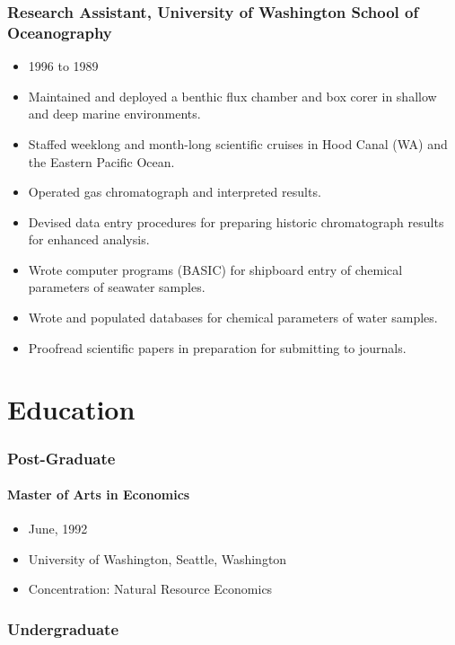 \documentclass[12pt]{article}
\begin{document}
\subsubsection{Research Assistant, University of Washington School of Oceanography}

\begin{itemize}
\item 1996 to 1989
\item
  Maintained and deployed a benthic flux chamber and box corer in
  shallow and deep marine environments.
\item
  Staffed weeklong and month-long scientific cruises in Hood Canal (WA)
  and the Eastern Pacific Ocean.
\item
  Operated gas chromatograph and interpreted results.
\item
  Devised data entry procedures for preparing historic chromatograph
  results for enhanced analysis.
\item
  Wrote computer programs (BASIC) for shipboard entry of chemical
  parameters of seawater samples.
\item
  Wrote and populated databases for chemical parameters of water
  samples.
\item
  Proofread scientific papers in preparation for submitting to journals.
\end{itemize}

\section {Education}

\subsubsection{Post-Graduate}

\paragraph{Master of Arts in Economics}

\begin{itemize}

\item
  June, 1992
\item
  University of Washington, Seattle, Washington
\item
  Concentration: Natural Resource Economics
\end{itemize}

\subsubsection{Undergraduate}
\end{document}
